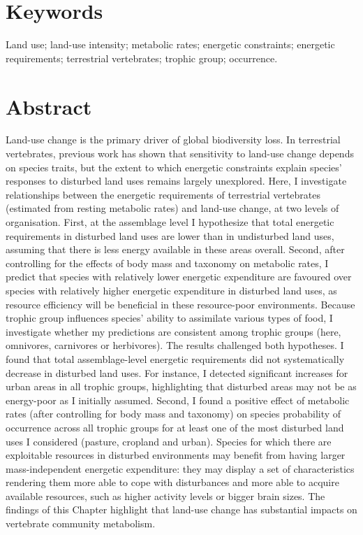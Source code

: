 
\section*{Keywords}
Land use; land-use intensity; metabolic rates; energetic constraints; energetic requirements; terrestrial vertebrates; trophic group; occurrence.

\section*{Abstract}
Land-use change is the primary driver of global biodiversity loss. In terrestrial vertebrates, previous work has shown that sensitivity to land-use change depends on species traits, but the extent to which energetic constraints explain species' responses to disturbed land uses remains largely unexplored. Here, I investigate relationships between the energetic requirements of terrestrial vertebrates (estimated from resting metabolic rates) and land-use change, at two levels of organisation. First, at the assemblage level I hypothesize that total energetic requirements in disturbed land uses are lower than in undisturbed land uses, assuming that there is less energy available in these areas overall. Second, after controlling for the effects of body mass and taxonomy on metabolic rates, I predict that species with relatively lower energetic expenditure are favoured over species with relatively higher energetic expenditure in disturbed land uses, as resource efficiency will be beneficial in these resource-poor environments. Because trophic group   influences species' ability to assimilate various types of food, I investigate whether my predictions are consistent among trophic groups (here, omnivores, carnivores or herbivores).
The results challenged both hypotheses. I found that total assemblage-level energetic requirements did not systematically decrease in disturbed land uses. For instance, I detected significant increases for urban areas in all trophic groups, highlighting that disturbed areas may not be as energy-poor as I initially assumed. Second, I found a positive effect of metabolic rates (after controlling for body mass and taxonomy) on species probability of occurrence across all trophic groups for at least one of the most disturbed land uses I considered (pasture, cropland and urban). Species for which there are exploitable resources in disturbed environments may benefit from having larger mass-independent energetic expenditure: they may display a set of characteristics rendering them more able to cope with disturbances and more able to acquire available resources, such as higher activity levels or bigger brain sizes. The findings of this Chapter highlight that land-use change has substantial impacts on vertebrate community metabolism.   


